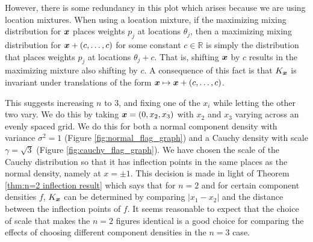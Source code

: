 	However, there is some redundancy in this plot which arises because we are using location mixtures. When using a location mixture, if the maximizing mixing distribution for ${\bm{{x}}}$ places weights $p_j$ at locations $\theta_j$, then a maximizing mixing distribution for ${\bm{{x}}} + (c, \dots, c)$ for some constant $c \in \mathbb{R}$ is simply the distribution that places weights $p_j$ at locations $\theta_j + c$. That is, shifting ${\bm{{x}}}$ by $c$ results in the maximizing mixture also shifting by $c$. A consequence of this fact is that $K_{\bm{{x}}}$ is invariant under translations of the form ${\bm{{x}}} \mapsto {\bm{{x}}} + (c, \dots, c)$.

	This suggests increasing $n$ to $3$, and fixing one of the $x_i$ while letting the other two vary. We do this by taking ${\bm{{x}}} = (0, x_2, x_3)$ with $x_2$ and $x_3$ varying across an evenly spaced grid. We do this for both a normal component density with variance $\sigma^2 = 1$ (Figure \ref{fig:normal_flag_graph}) and a Cauchy density with scale $\gamma = \sqrt{3}$ (Figure \ref{fig:cauchy_flag_graph}). We have chosen the scale of the Cauchy distribution so that it has inflection points in the same places as the normal density, namely at $x = \pm 1$. This decision is made in light of Theorem \ref{thm:n=2 inflection result} which says that for $n = 2$ and for certain component densities $f$, $K_{\bm{{x}}}$ can be determined by comparing $|x_1 - x_2|$ and the distance between the inflection points of $f$. It seems reasonable to expect that the choice of scale that makes the $n = 2$ figures identical is a good choice for comparing the effects of choosing different component densities in the $n = 3$ case.

	

